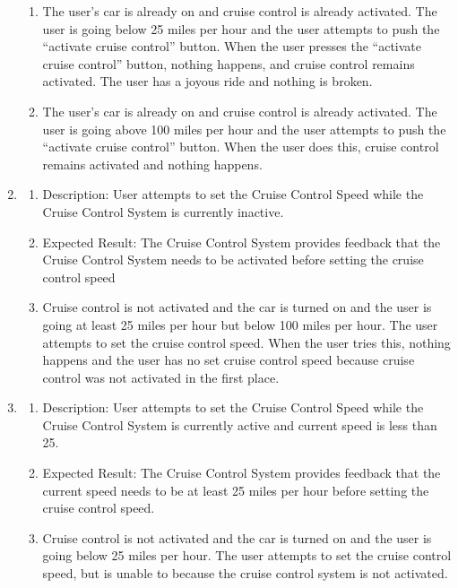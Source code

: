 \documentclass[preprint,11pt,3p]{article}
\begin{document}
\begin{enumerate}
\begin{enumerate}
		\item The user’s car is already on and cruise control is already activated. The user is going below 25 miles per hour and the user attempts to push the “activate cruise control” button. When the user presses the “activate cruise control” button, nothing happens, and cruise control remains activated. The user has a joyous ride and nothing is broken.
		\item The user’s car is already on and cruise control is already activated. The user is going above 100 miles per hour and the user attempts to push the “activate cruise control” button. When the user does this, cruise control remains activated and nothing happens.
		\end{enumerate}
	\item 
		\begin{enumerate}
	\item Description: User attempts to set the Cruise Control Speed while the Cruise Control System is currently inactive.
	\item Expected Result: The Cruise Control System provides feedback that the Cruise Control System needs to be activated before setting the cruise control speed
	\item Cruise control is not activated and the car is turned on and the user is going at least 25 miles per hour but below 100 miles per hour. The user attempts to set the cruise control speed. When the user tries this, nothing happens and the user has no set cruise control speed because cruise control was not activated in the first place. 
\end{enumerate}

	\item 
		\begin{enumerate}
	\item Description: User attempts to set the Cruise Control Speed while the Cruise Control System is currently active and current speed is less than 25.
	\item Expected Result: The Cruise Control System provides feedback that the current speed needs to be at least 25 miles per hour before setting the cruise control speed.
	\item Cruise control is not activated and the car is turned on and the user is going below 25 miles per hour. The user attempts to set the cruise control speed, but is unable to because the cruise control system is not activated.
\end{enumerate}


\end{enumerate}
\end{document}
